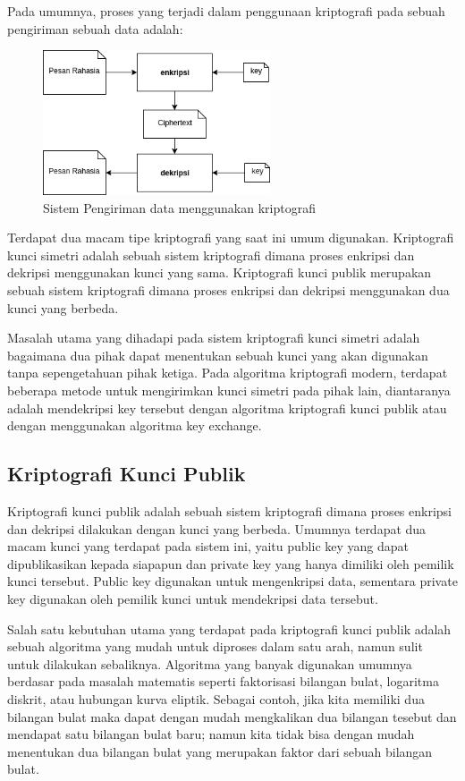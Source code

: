   Pada umumnya, proses yang terjadi dalam penggunaan kriptografi pada sebuah pengiriman sebuah data adalah:
  \begin{figure}[h]
    \centering
    \includegraphics[width=0.6\textwidth]{resources/ch-2/crypto-system.jpg}
    \caption{Sistem Pengiriman data menggunakan kriptografi}
  \end{figure}

  Terdapat dua macam tipe kriptografi yang saat ini umum digunakan. Kriptografi kunci simetri adalah sebuah sistem kriptografi dimana proses enkripsi dan dekripsi menggunakan kunci yang sama. Kriptografi kunci publik merupakan sebuah sistem kriptografi dimana proses enkripsi dan dekripsi menggunakan dua kunci yang berbeda.

  Masalah utama yang dihadapi pada sistem kriptografi kunci simetri adalah bagaimana dua pihak dapat menentukan sebuah kunci yang akan digunakan tanpa sepengetahuan pihak ketiga. Pada algoritma kriptografi modern, terdapat beberapa metode untuk mengirimkan kunci simetri pada pihak lain, diantaranya adalah mendekripsi key tersebut dengan algoritma kriptografi kunci publik atau dengan menggunakan algoritma key exchange.

  \subsection{Kriptografi Kunci Publik}

    Kriptografi kunci publik adalah sebuah sistem kriptografi dimana proses enkripsi dan dekripsi dilakukan dengan kunci yang berbeda. Umumnya terdapat dua macam kunci yang terdapat pada sistem ini, yaitu public key yang dapat dipublikasikan kepada siapapun dan private key yang hanya dimiliki oleh pemilik kunci tersebut. Public key digunakan untuk mengenkripsi data, sementara private key digunakan oleh pemilik kunci untuk mendekripsi data tersebut.

    Salah satu kebutuhan utama yang terdapat pada kriptografi kunci publik adalah sebuah algoritma yang mudah untuk diproses dalam satu arah, namun sulit untuk dilakukan sebaliknya. Algoritma yang banyak digunakan umumnya berdasar pada masalah matematis seperti faktorisasi bilangan bulat, logaritma diskrit, atau hubungan kurva eliptik. Sebagai contoh, jika kita memiliki dua bilangan bulat maka dapat dengan mudah mengkalikan dua bilangan tesebut dan mendapat satu bilangan bulat baru; namun kita tidak bisa dengan mudah menentukan dua bilangan bulat yang merupakan faktor dari sebuah bilangan bulat.

